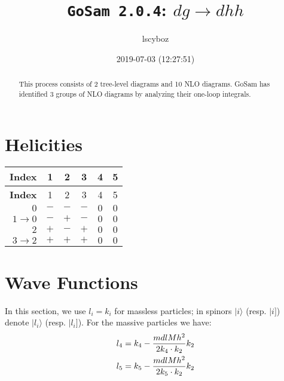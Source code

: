 \documentclass[a4paper]{article}
\title{\texttt{GoSam 2.0.4}: ${d}{g}\rightarrow{d}{h}{h}$}
\author{lscyboz}
\date{2019-07-03 (12:27:51)}
\newcommand{\kea}[1]{\vert #1 \rangle}
\newcommand{\keb}[1]{\vert #1 ]}
\begin{document}
\maketitle
\begin{abstract}
\noindent This process consists of 2 tree-level diagrams and 10 NLO diagrams. GoSam has identified 3 groups  of NLO diagrams by analyzing their one-loop integrals.
\end{abstract}
\newpage
\tableofcontents
\newpage

\section{Helicities}

\begin{longtable}[c]{r|ccccc}
\bf{Index} &1&2&3&4&5\\
\hline
\endfirsthead
\bf{Index} &1&2&3&4&5\\
\hline
\endhead 
$0$& $-$& $-$& $-$& $0$& $0$\\
$1\rightarrow 0$& $-$& $+$& $-$& $0$& $0$\\
$2$& $+$& $-$& $+$& $0$& $0$\\
$3\rightarrow 2$& $+$& $+$& $+$& $0$& $0$\\
\end{longtable}
\section{Wave Functions}
In this section, we use $l_i=k_i$ for massless particles;
in spinors $\kea{i}$ (resp. $\keb{i}$) denote $\kea{l_i}$ (resp. $\keb{l_i}$).
For the massive particles we have:
\begin{align}
l_{4} &= k_{4} - \frac{mdlMh^2}{%
      2 k_{4}\cdot k_{2}}k_{2}\\
l_{5} &= k_{5} - \frac{mdlMh^2}{%
      2 k_{5}\cdot k_{2}}k_{2}
\end{align}
\end{document}
